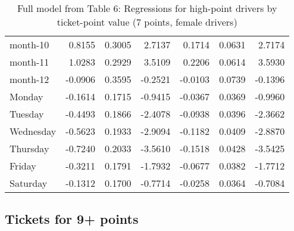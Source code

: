 \documentclass[10pt]{article}
\begin{document}
\begin{table}[ht]
\begin{tabular}{lrrrrrr}
  month-10 & 0.8155 & 0.3005 & 2.7137 & 0.1714 & 0.0631 & 2.7174 \\ 
  month-11 & 1.0283 & 0.2929 & 3.5109 & 0.2206 & 0.0614 & 3.5930 \\ 
  month-12 & -0.0906 & 0.3595 & -0.2521 & -0.0103 & 0.0739 & -0.1396 \\ 
  Monday & -0.1614 & 0.1715 & -0.9415 & -0.0367 & 0.0369 & -0.9960 \\ 
  Tuesday & -0.4493 & 0.1866 & -2.4078 & -0.0938 & 0.0396 & -2.3662 \\ 
  Wednesday & -0.5623 & 0.1933 & -2.9094 & -0.1182 & 0.0409 & -2.8870 \\ 
  Thursday & -0.7240 & 0.2033 & -3.5610 & -0.1518 & 0.0428 & -3.5425 \\ 
  Friday & -0.3211 & 0.1791 & -1.7932 & -0.0677 & 0.0382 & -1.7712 \\ 
  Saturday & -0.1312 & 0.1700 & -0.7714 & -0.0258 & 0.0364 & -0.7084 \\ 
   \hline
\end{tabular}
\caption{Full model from Table 6: Regressions for high-point drivers by ticket-point value (7 points, female drivers)} 
\label{tab_6_7_pts_no_age_F}
\end{table}


\clearpage
\pagebreak




\subsection{Tickets for 9+ points}



\end{document}
